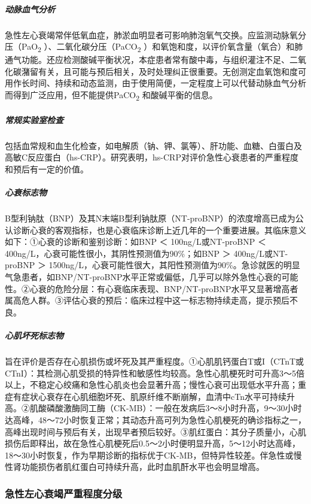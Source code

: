 \subparagraph{动脉血气分析}

急性左心衰竭常伴低氧血症，肺淤血明显者可影响肺泡氧气交换。应监测动脉氧分压（PaO\textsubscript{2}
）、二氧化碳分压（PaCO\textsubscript{2}
）和氧饱和度，以评价氧含量（氧合）和肺通气功能。还应检测酸碱平衡状况，本症患者常有酸中毒，与组织灌注不足、二氧化碳潴留有关，且可能与预后相关，及时处理纠正很重要。无创测定血氧饱和度可用作长时间、持续和动态监测，由于使用简便，一定程度上可以代替动脉血气分析而得到广泛应用，但不能提供PaCO\textsubscript{2}
和酸碱平衡的信息。

\subparagraph{常规实验室检查}

包括血常规和血生化检查，如电解质（钠、钾、氯等）、肝功能、血糖、白蛋白及高敏C反应蛋白（hs-CRP）。研究表明，hs-CRP对评价急性心衰患者的严重程度和预后有一定的价值。

\subparagraph{心衰标志物}

B型利钠肽（BNP）及其N末端B型利钠肽原（NT-proBNP）的浓度增高已成为公认诊断心衰的客观指标，也是心衰临床诊断上近几年的一个重要进展。其临床意义如下：①心衰的诊断和鉴别诊断：如BNP
＜ 100ng/L或NT-proBNP ＜
400ng/L，心衰可能性很小，其阴性预测值为90\%；如BNP ＞ 400ng/L或NT-proBNP
＞
1500ng/L，心衰可能性很大，其阳性预测值为90\%。急诊就医的明显气急患者，如BNP/NT-proBNP水平正常或偏低，几乎可以除外急性心衰的可能性。②心衰的危险分层：有心衰临床表现、BNP/NT-proBNP水平又显著增高者属高危人群。③评估心衰的预后：临床过程中这一标志物持续走高，提示预后不良。

\subparagraph{心肌坏死标志物}

旨在评价是否存在心肌损伤或坏死及其严重程度。①心肌肌钙蛋白T或I（CTnT或CTnI）：其检测心肌受损的特异性和敏感性均较高。急性心肌梗死时可升高3～5倍以上，不稳定心绞痛和急性心肌炎也会显著升高；慢性心衰可出现低水平升高；重症有症状心衰存在心肌细胞坏死、肌原纤维不断崩解，血清中cTn水平可持续升高。②肌酸磷酸激酶同工酶（CK-MB）：一般在发病后3～8小时升高，9～30小时达高峰，48～72小时恢复正常；其动态升高可列为急性心肌梗死的确诊指标之一，高峰出现时间与预后有关，出现早者预后较好。③肌红蛋白：其分子质量小，心肌损伤后即释出，故在急性心肌梗死后0.5～2小时便明显升高，5～12小时达高峰，18～30小时恢复，作为早期诊断的指标优于CK-MB，但特异性较差。伴急性或慢性肾功能损伤者肌红蛋白可持续升高，此时血肌酐水平也会明显增高。

\subsubsection{急性左心衰竭严重程度分级}

